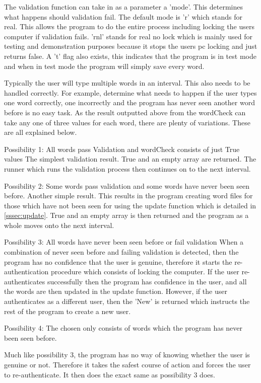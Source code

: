 \documentclass[10pt,a4paper]{report}
\begin{document}
The validation function can take in as a parameter a 'mode'. This determines what happens should validation fail. The default mode is 'r' which stands for real. This allows the program to do the entire process including locking the users computer if validation fails. 'rnl' stands for real no lock which is mainly used for testing and demonstration purposes because it stops the users pc locking and just returns false. A 't' flag also exists, this indicates that the program is in test mode and when in test mode the program will simply save every word.

Typically the user will type multiple words in an interval. This also needs to be handled correctly. For example, determine what needs to happen if the user types one word correctly, one incorrectly and the program has never seen another word before is no easy task. As the result outputted above from the wordCheck can take any one of three values for each word, there are plenty of variations. These are all explained below.

Possibility 1: All words pass Validation and wordCheck consists of just True values
The simplest validation result. True and an empty array are returned. The runner which runs the validation process then continues on to the next interval.

Possibility 2: Some words pass validation and some words have never been seen before.
Another simple result. This results in the program creating word files for those which have not been seen for using the update function which is detailed in \ref{sssec:update}. True and an empty array is then returned and the program as a whole moves onto the next interval.

Possibility 3: All words have never been seen before or fail validation
When a combination of never seen before and failing validation is detected, then the program has no confidence that the user is genuine, therefore it starts the re-authentication procedure which consists of locking the computer. If the user re-authenticates successfully then the program has confidence in the user, and all the words are then updated in the update function. However, if the user authenticates as a different user, then the 'New' is returned which instructs the rest of the program to create a new user.

Possibility 4: The chosen only consists of words which the program has never been seen before.

Much like possibility 3, the program has no way of knowing whether the user is genuine or not. Therefore it takes the safest course of action and forces the user to re-authenticate. It then does the exact same as possibility 3 does.
\end{document}
